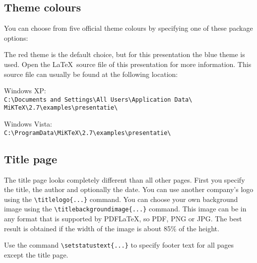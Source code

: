 \documentclass[a4paper]{article}            %
\begin{document}
\begin{slidetop}
\section*{Theme colours}

You can choose from five official theme colours by specifying one of these package options: 
\iffalse
{\color{tuecyan}themered},
{\color{tuecyan}themecyan},
{\color{tuecyan}themeorange},
{\color{tuecyan}themegreen}, or {\color{tuecyan}themeblue}. 
\fi
The red theme is the default choice, but for this presentation the blue theme is used. Open the \LaTeX\ source file of this presentation for more information. This source file can usually be found at the following location:

\bigskip
Windows XP:\\
\verb|C:\Documents and Settings\All Users\Application Data\|
\verb|MiKTeX\2.7\examples\presentatie\|

\bigskip
Windows Vista:\\ \verb|C:\ProgramData\MiKTeX\2.7\examples\presentatie\|
\end{slidetop}

\begin{slidetop}

\section*{Title page}

The title page looks completely different than all other pages. First you specify the title, the author and optionally the date.
You can use another company's logo using the \verb|\titlelogo{...}| command. You can choose your own background image using the
\verb|\titlebackgroundimage{...}| command. This image can be in any format that is supported by PDF\LaTeX, so PDF, PNG or JPG. The best result is obtained if the width of the image is about 85\% of the height.

Use the command \verb|\setstatustext{...}| to specify footer text for all pages except the title page.
\end{slidetop}
\end{document}
